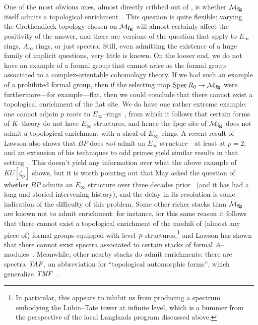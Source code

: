 One of the most obvious ones, almost directly cribbed out of , is whether \(\mathcal{M}_{\mathbf{fg}}\) itself admits a topological enrichment~\cite{GoerssRealizingFamilies}.  This question is quite flexible: varying the Grothendieck topology chosen on \(\mathcal{M}_{\mathbf{fg}}\) will almost certainly affect the positivity of the answer, and there are versions of the question that apply to \(E_\infty\) rings, \(A_\infty\) rings, or just spectra.  Still, even admitting the existence of a huge family of implicit questions, very little is known.  On the looser end, we do not have an example of a formal group that cannot arise as the formal group associated to a complex-orientable cohomology theory.  If we had such an example of a prohibited formal group, then if the selecting map \(\operatorname{Spec} R_0 \to \mathcal{M}_{\mathbf{fg}}\) were furthermore---for example---flat, then we could conclude that there cannot exist a topological enrichment of the flat site.  We do have one rather extreme example: one cannot adjoin \(p\){\th} roots to \(E_\infty\)--rings~\cite{SchwaenzlRolandVogt,Devalapurkar}, from which it follows that certain forms of \(K\)--theory do not have \(E_\infty\) structures, and hence the fpqc site of \(\mathcal{M}_{\mathbf{fg}}\) does not admit a topological enrichment with a sheaf of \(E_\infty\)--rings.  A recent result of Lawson also shows that \(BP\) does \emph{not} admit an \(E_\infty\) structure---at least at \(p = 2\), and an extension of his techniques to odd primes yield similar results in that setting~\cite{LawsonSecondaryPowerOps,Senger}.  This doesn't yield any information over what the above example of \(KU[\zeta_p]\) shows, but it is worth pointing out that May asked the question of whether \(BP\) admits an \(E_\infty\) structure over three decades prior~\cite{MayProblemsInLoopspaceTheory} (and it has had a long and storied intervening history), and the delay in its resolution is some indication of the difficulty of this problem.  Some other richer stacks than \(\mathcal{M}_{\mathbf{fg}}\) are known not to admit enrichment: for instance, for this same reason it follows that there cannot exist a topological enrichment of the moduli of (almost any piece of) formal groups equipped with level--\(p\) structures,\footnote{In particular, this appears to inhibit us from producing a spectrum embodying the Lubin--Tate tower at infinite level, which is a bummer from the perspective of the local Langlands program discussed above.} and Lawson has shown that there cannot exist spectra associated to certain stacks of formal \(A\)--modules~\cite{LawsonRealizability}.  Meanwhile, other nearby stacks do admit enrichments: there are spectra \(\mathit{TAF}\), an abbreviation for ``topological automorphic forms'', which generalize \(\mathit{TMF}\)~\cite{BehrensLawson}.

